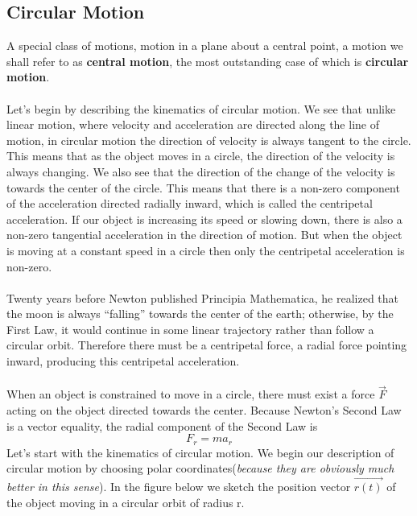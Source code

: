 \documentclass[12pt,addpoints]{exam}
\begin{document}
	\subsection*{Circular Motion}
	A special class of motions, motion in a plane about a central point, a motion we shall refer to as \textbf{central motion}, the most outstanding case of which is \textbf{circular motion}. \\ \\
	Let's begin by describing the kinematics of circular motion. We see that unlike linear motion, where velocity and acceleration are directed along the line of motion, in circular motion the direction of velocity is always tangent to the circle. This means that as the object moves in a circle, the direction of the velocity is always changing. We also see that the direction of the change of the velocity is towards the center of the circle. This means that there is a non-zero component of the acceleration directed radially inward, which is called the centripetal acceleration. If our object is increasing its speed or slowing down, there is also a non-zero tangential acceleration in the direction of motion. But when the object is moving at a constant speed in a circle then only the centripetal acceleration is non-zero.\\ \\
	Twenty years before Newton published Principia Mathematica, he realized that the moon is always “falling” towards the center of the earth; otherwise, by the First Law, it would continue in some linear trajectory rather than follow a circular orbit. Therefore there must be a centripetal force, a radial force pointing inward, producing this centripetal acceleration. \\ \\
	When an object is constrained to move in a circle, there must exist a force $\vec{F}$ acting on the object directed towards the center. Because Newton’s Second Law is a vector equality, the radial component of the Second Law is
	$$F_{r}=m a_{r} \nonumber$$
	Let's start with the kinematics of circular motion. We begin our description of circular motion by choosing polar coordinates(\textit{because they are obviously much better in this sense}). In the figure below we sketch the position vector $\vec{r(t)}$ of the object moving in a circular orbit of radius r.
\end{document}
